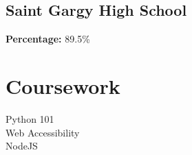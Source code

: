 \documentclass[letterpaper]{deedy-resume} %
\begin{document}
\begin{minipage}[t]{0.33\textwidth}
\sectionspace %





\subsection{Saint Gargy High School}
\textbf{Percentage:} 89.5\%

\sectionspace %





\section{Coursework}

Python 101 \\
Web Accessibility \\
NodeJS \\
\sectionspace %



\end{minipage} %
\hfill
%
%
\end{document}
